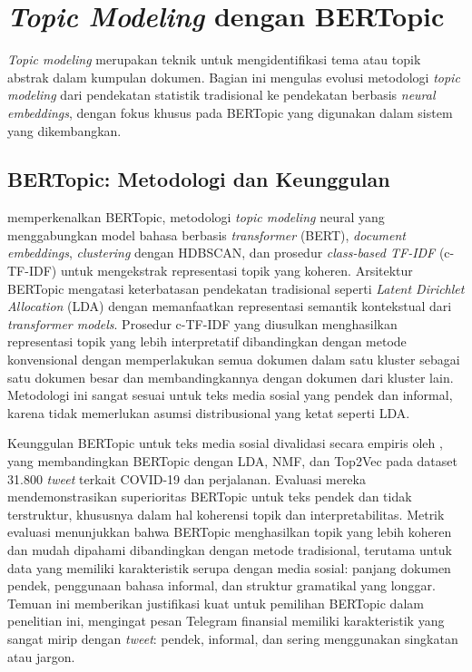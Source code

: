 \section{\textit{Topic Modeling} dengan BERTopic}
\label{sec:topic-modeling}

\textit{Topic modeling} merupakan teknik untuk mengidentifikasi tema atau topik abstrak dalam kumpulan dokumen. Bagian ini mengulas evolusi metodologi \textit{topic modeling} dari pendekatan statistik tradisional ke pendekatan berbasis \textit{neural embeddings}, dengan fokus khusus pada BERTopic yang digunakan dalam sistem yang dikembangkan.

\subsection{BERTopic: Metodologi dan Keunggulan}

\textcite{grootendorst2022} memperkenalkan BERTopic, metodologi \textit{topic modeling} neural yang menggabungkan model bahasa berbasis \textit{transformer} (BERT), \textit{document embeddings}, \textit{clustering} dengan HDBSCAN, dan prosedur \textit{class-based TF-IDF} (c-TF-IDF) untuk mengekstrak representasi topik yang koheren. Arsitektur BERTopic mengatasi keterbatasan pendekatan tradisional seperti \textit{Latent Dirichlet Allocation} (LDA) dengan memanfaatkan representasi semantik kontekstual dari \textit{transformer models}. Prosedur c-TF-IDF yang diusulkan menghasilkan representasi topik yang lebih interpretatif dibandingkan dengan metode konvensional dengan memperlakukan semua dokumen dalam satu kluster sebagai satu dokumen besar dan membandingkannya dengan dokumen dari kluster lain. Metodologi ini sangat sesuai untuk teks media sosial yang pendek dan informal, karena tidak memerlukan asumsi distribusional yang ketat seperti LDA.

Keunggulan BERTopic untuk teks media sosial divalidasi secara empiris oleh \textcite{egger2022}, yang membandingkan BERTopic dengan LDA, NMF, dan Top2Vec pada dataset 31.800 \textit{tweet} terkait COVID-19 dan perjalanan. Evaluasi mereka mendemonstrasikan superioritas BERTopic untuk teks pendek dan tidak terstruktur, khususnya dalam hal koherensi topik dan interpretabilitas. Metrik evaluasi menunjukkan bahwa BERTopic menghasilkan topik yang lebih koheren dan mudah dipahami dibandingkan dengan metode tradisional, terutama untuk data yang memiliki karakteristik serupa dengan media sosial: panjang dokumen pendek, penggunaan bahasa informal, dan struktur gramatikal yang longgar. Temuan ini memberikan justifikasi kuat untuk pemilihan BERTopic dalam penelitian ini, mengingat pesan Telegram finansial memiliki karakteristik yang sangat mirip dengan \textit{tweet}: pendek, informal, dan sering menggunakan singkatan atau jargon.

